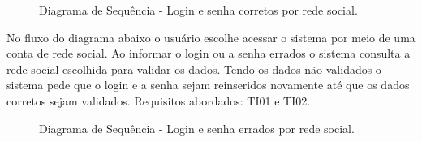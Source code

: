 \documentclass[12pt]{article}
\begin{document}
  \begin{figure}[H]
    \caption{\label{fig:dssLogin03} Diagrama de Sequência - Login e senha corretos por rede social.}
  \end{figure}
No fluxo do diagrama abaixo o usuário escolhe acessar o sistema por meio de uma conta de rede social. Ao informar o login ou a senha errados o sistema consulta a rede social escolhida para validar os dados. Tendo os dados não validados o sistema pede que o login e a senha sejam reinseridos novamente até que os dados corretos sejam validados. Requisitos abordados: TI01 e TI02.
  \begin{figure}[H]
    \caption{\label{fig:dssLogin04} Diagrama de Sequência - Login e senha errados por rede social.}
  \end{figure}
\end{document}
